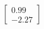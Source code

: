 \documentclass[preview]{standalone}
\begin{document}
\begin{align*}
\begin{bmatrix} 0.99 \\ -2.27 \end{bmatrix}
\end{align*}
\end{document}
